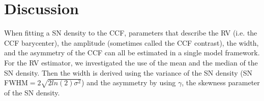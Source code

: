 \documentclass{aa}
\begin{document}


\section{Discussion} \label{sec:discu}

When fitting a SN density to the CCF, parameters that describe the RV (i.e. the CCF barycenter), the amplitude (sometimes called the CCF contrast), the width, and the asymmetry of the CCF can all be estimated in a single model framework.
For the RV estimator, we investigated the use of the mean and the median of the SN density. 
Then the width is derived using the variance of the SN density (SN FWHM$=2\sqrt{2ln(2)\sigma^2}$) and the asymmetry by using $\gamma$, the skewness parameter of the SN density.
\end{document}
